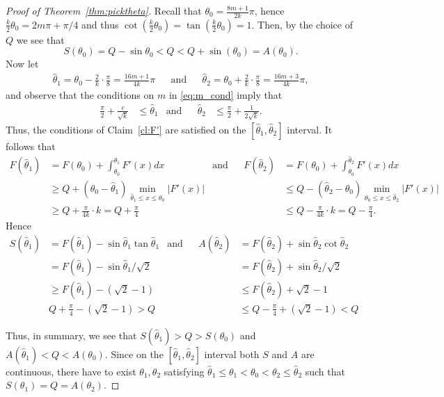 \documentclass[10pt,a4paper]{amsart}
\newcommand{\htheta}{\hat{\theta}}
\begin{document}
\begin{proof}[Proof of Theorem~\ref{thm:picktheta}]
Recall that $\theta_0 = \tfrac{8m+1}{2k}\pi$, hence \(\tfrac{k}{2}\theta_0 = 2m\pi + \pi/4\) and thus $\cot(\tfrac{k}{2}\theta_0) = \tan(\tfrac{k}{2}\theta_0)=1$. Then, by the choice of $Q$ we see that 
\[ S(\theta_0 ) = Q -  \sin \theta_0  < Q < Q + \sin(\theta_0) = A(\theta_0).\]
Now let  
\begin{align*} \htheta_1 = \theta_0 - \frac{2}{k}\cdot \frac{\pi}{8} = \frac{16m+1}{4k}\pi && \mbox{and} && \htheta_2 = \theta_0 + \frac{2}{k}\cdot \frac{\pi}{8} = \frac{16m+3}{4k}\pi,\end{align*} and observe that the conditions on $m$ in \eqref{eq:m_cond} imply that 
\begin{align*}\frac{\pi}{2} + \frac{c}{\sqrt{k}} &\leq \htheta_1 & \mbox{and}&& \htheta_2 &\leq \frac{\pi}{2} + \frac{1}{2\sqrt{k}}.
\end{align*} Thus, the conditions of Claim~\ref{cl:F'} are satisfied on the $[\htheta_1,\htheta_2]$ interval. It follows that
\begin{align*}
    F(\htheta_1) &= F(\theta_0)+\int_{\theta_0}^{\htheta_1} F'(x)dx & \mbox{and}& & F(\htheta_2) &= F(\theta_0) + \int_{\theta_0}^{\htheta_2} F'(x)dx \\
    &\geq Q + (\theta_0-\htheta_1)\min_{\htheta_1 \leq x \leq \theta_0} |F'(x)| &&& &\leq Q - (\htheta_2-\theta_0)\min_{\theta_0 \leq x \leq \htheta_2} |F'(x)|\\
    &\geq Q + \frac{\pi}{4k} \cdot k = Q+ \frac{\pi}{4} &&& &\leq Q - \frac{\pi}{4k}\cdot k = Q - \frac{\pi}{4}. \end{align*}
Hence 
\begin{align*}
    S(\htheta_1) &= F(\htheta_1) - \sin \htheta_1 \tan \htheta_1 & \mbox{and}& & A(\htheta_2)&= F(\htheta_2) + \sin \htheta_2 \cot \htheta_2 \\
    &=F(\htheta_1) - \sin \htheta_1 / \sqrt{2}& && &= F(\htheta_2) + \sin \htheta_2/ \sqrt{2} \\
    &\geq F(\htheta_1)-(\sqrt{2}-1) && &&  \leq F(\htheta_2)+\sqrt{2}-1 \\
    &Q + \frac{\pi}{4} - (\sqrt{2}-1) >Q&& && \leq Q - \frac{\pi}{4} + (\sqrt{2}-1) < Q
\end{align*}

Thus, in summary, we see that $S(\htheta_1) > Q > S(\theta_0)$ and $A(\htheta_1) < Q < A(\theta_0)$. Since on the $[\htheta_1, \htheta_2]$ interval both $S$ and $A$ are continuous, there have to exist $\theta_1, \theta_2$ satisfying $\htheta_1 \leq \theta_1 < \theta_0 < \theta_2 \leq \htheta_2$ such that $S(\theta_1) = Q = A(\theta_2)$.


\end{proof}
\end{document}
